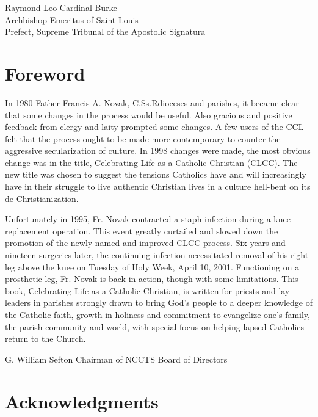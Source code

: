 \documentclass[oneside]{book}
\begin{document}
Raymond Leo Cardinal Burke \\
Archbishop Emeritus of Saint Louis \\
Prefect, Supreme Tribunal of the Apostolic Signatura

\pagebreak


\chapter{Foreword}

In 1980 Father Francis A. Novak, C.Ss.Rdioceses and parishes, it became clear
that some changes in the process would be useful. Also gracious and positive
feedback from clergy and laity prompted some changes. A few users of the CCL
felt that the process ought to be made more contemporary to counter the
aggressive secularization of culture. In 1998 changes were made, the most
obvious change was in the title, Celebrating Life as a Catholic Christian
(CLCC). The new title was chosen to suggest the tensions Catholics have and will
increasingly have in their struggle to live authentic Christian lives in a
culture hell-bent on its de-Christianization.

Unfortunately in 1995, Fr. Novak contracted a staph infection during a knee
replacement operation. This event greatly curtailed and slowed down the
promotion of the newly named and improved CLCC process. Six years and nineteen
surgeries later, the continuing infection necessitated removal of his right leg
above the knee on Tuesday of Holy Week, April 10, 2001.
Functioning on a prosthetic leg, Fr. Novak is back in action, though with some
limitations. This book, Celebrating Life as a Catholic Christian, is written for
priests and lay leaders in parishes strongly drawn to bring God's people to a
deeper knowledge of the Catholic faith, growth in holiness and commitment to
evangelize one's family, the parish community and world, with special focus on
helping lapsed Catholics return to the Church.

G. William Sefton
Chairman of NCCTS Board of Directors


\chapter{Acknowledgments}
\end{document}
